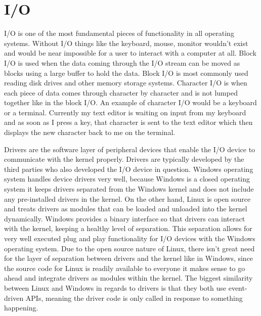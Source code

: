 \documentclass[10pt,serif,draftclsnofoot,onecolumn]{IEEEtran}
\begin{document}
	\section{I/O}
	\par
			I/O is one of the most fundamental pieces of functionality in all operating systems. Without I/O things like the keyboard, mouse, monitor wouldn't exist and would be near impossible for a user to interact with a computer at all. Block I/O is used when the data coming through the I/O stream can be moved as blocks using a large buffer to hold the data. Block I/O is most commonly used reading disk drives and other memory storage systems. Character I/O is when each piece of data comes through character by character and is not lumped together like in the block I/O. An example of character I/O would be a keyboard or a terminal. Currently my text editor is waiting on input from my keyboard and as soon as I press a key, that character is sent to the text editor which then displays the new character back to me on the terminal.
	\newline
	\newline
	\par
			Drivers are the software layer of peripheral devices that enable the I/O device to communicate with the kernel properly. Drivers are typically developed by the third parties who also developed the I/O device in question. Windows operating system handles device drivers very well, because Windows is a closed operating system it keeps drivers separated from the Windows kernel and does not include any pre-installed drivers in the kernel. On the other hand, Linux is open source and treats drivers as modules that can be loaded and unloaded into the kernel dynamically\cite{6}. Windows provides a binary interface so that drivers can interact with the kernel, keeping a healthy level of separation. This separation allows for very well executed plug and play functionality for I/O devices with the Windows operating system. Due to the open source nature of Linux, there isn't great need for the layer of separation between drivers and the kernel like in Windows, since the source code for Linux is readily available to everyone it makes sense to go ahead and integrate drivers as modules within the kernel. The biggest similarity between Linux and Windows in regards to drivers is that they both use event-driven APIs, meaning the driver code is only called in response to something happening\cite{6}.
	\newline
	\newline
\end{document}
